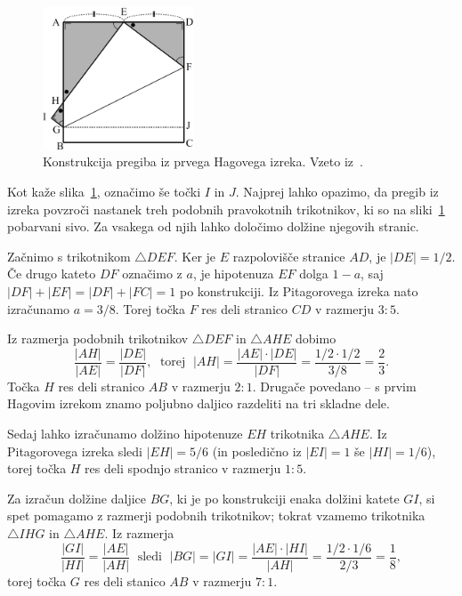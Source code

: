 \begin{figure}[h]
    \centering
    \includegraphics[width=0.4\textwidth]{images/hagovi_izreki/hagov_izrek1.png}
    \caption[Pregib iz prvega Hagovega izreka]{Konstrukcija pregiba iz prvega Hagovega izreka. Vzeto iz~\cite[str. 4]{haga2008}.}
    \label{fig:hagov_izrek1}
\end{figure}

\begin{dokaz}
    Kot kaže slika~\ref{fig:hagov_izrek1}, označimo še točki $I$ in $J$. Najprej lahko opazimo, da pregib iz izreka povzroči nastanek treh podobnih pravokotnih trikotnikov, ki so na sliki~\ref{fig:hagov_izrek1} pobarvani sivo. Za vsakega od njih lahko določimo dolžine njegovih stranic.

    Začnimo s trikotnikom $\triangle DEF$. Ker je $E$ razpolovišče stranice $AD$, je $|DE| = 1/2$. Če drugo kateto $DF$ označimo z $a$, je hipotenuza $EF$ dolga $1-a$, saj $|DF| + |EF| = |DF| + |FC| = 1$ po konstrukciji. Iz Pitagorovega izreka nato izračunamo $a = 3/8$. Torej točka $F$ res deli stranico $CD$ v razmerju $3:5$.

    Iz razmerja podobnih trikotnikov $\triangle DEF$ in $\triangle AHE$ dobimo
    $$ \frac{|AH|}{|AE|} = \frac{|DE|}{|DF|}, \; \text{ torej } \; |AH| = \frac{|AE|\cdot|DE|}{|DF|} = \frac{1/2 \cdot 1/2}{3/8} = \frac{2}{3}.$$
    Točka $H$ res deli stranico $AB$ v razmerju $2:1$. Drugače povedano -- s prvim Hagovim izrekom znamo poljubno daljico razdeliti na tri skladne dele.

    Sedaj lahko izračunamo dolžino hipotenuze $EH$ trikotnika $\triangle AHE$. Iz Pitagorovega izreka sledi $|EH| = 5/6$ (in posledično iz $|EI| = 1$ še $|HI| = 1/6$), torej točka $H$ res deli spodnjo stranico v razmerju $1:5$.

    Za izračun dolžine daljice $BG$, ki je po konstrukciji enaka dolžini katete $GI$, si spet pomagamo z razmerji podobnih trikotnikov; tokrat vzamemo trikotnika $\triangle IHG$ in $\triangle AHE$. Iz razmerja
    $$ \frac{|GI|}{|HI|} = \frac{|AE|}{|AH|} \; \text{ sledi } \; |BG| = |GI| = \frac{|AE|\cdot|HI|}{|AH|} = \frac{1/2 \cdot 1/6}{2/3} = \frac{1}{8},$$
    torej točka $G$ res deli stanico $AB$ v razmerju $7:1$.
\end{dokaz}


